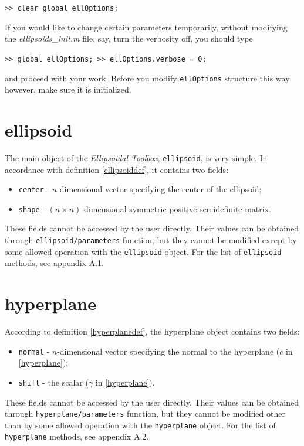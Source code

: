 \documentclass{report}
\begin{document}
{\tt >> clear global ellOptions;}

If you would like to change certain parameters temporarily, without
modifying the {\it ellipsoids\_init.m} file, say, turn the verbosity off,
you should type

{\tt >> global ellOptions;
\newline
>> ellOptions.verbose = 0;}

and proceed with your work. Before you modify {\tt ellOptions} structure
this way however, make sure it is initialized.



\section{ellipsoid}
The main object of the {\it Ellipsoidal Toolbox}, {\tt ellipsoid}, is
very simple. In accordance with definition \ref{ellipsoiddef}, it contains
two fields:
\begin{itemize}
\item {\tt center} - $n$-dimensional vector specifying the center
of the ellipsoid;
\item {\tt shape} - $(n\times n)$-dimensional symmetric positive
semidefinite matrix.
\end{itemize}
These fields cannot be accessed by the user directly. Their values
can be obtained through {\tt ellipsoid/parameters} function, but they cannot
be modified except by some allowed operation with the {\tt ellipsoid}
object. For the list of {\tt ellipsoid} methods, see appendix A.1.



\section{hyperplane}
According to  definition \ref{hyperplanedef}, the hyperplane object
contains two fields:
\begin{itemize}
\item {\tt normal} - $n$-dimensional vector specifying the normal to
the hyperplane ($c$ in \ref{hyperplane});
\item {\tt shift} - the scalar ($\gamma$ in \ref{hyperplane}).
\end{itemize}
These fields cannot be accessed by the user directly. Their values
can be obtained through {\tt hyperplane/parameters} function, but they cannot
be modified other than by some allowed operation with the {\tt hyperplane}
object. For the list of {\tt hyperplane} methods, see appendix A.2.
\end{document}
